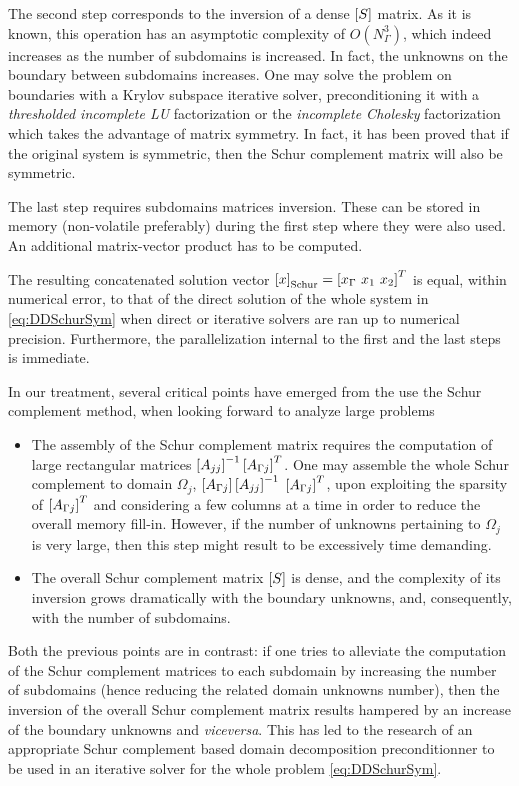 The second step corresponds to the inversion of a dense $\left[S\right]$ matrix. As it is known, this operation has an asymptotic complexity of $O(N_\Gamma^3)$, which indeed increases as the number of subdomains is increased. In fact, the unknowns on the boundary between subdomains increases. One may solve the problem on boundaries with a Krylov subspace iterative solver, preconditioning it with a \textit{thresholded incomplete LU} factorization  \cite{saad1994ilut} or the \textit{incomplete Cholesky} factorization which takes the advantage of matrix symmetry. In fact, it has been proved \cite{mathew2008domain} that if the original system is symmetric, then the Schur complement matrix will also be symmetric.

The last step requires subdomains matrices inversion. These can be stored in memory (non-volatile preferably) during the first step where they were also used. An additional matrix-vector product has to be computed.

The resulting concatenated solution vector $\vect{x}_\mathrm{Schur} = \vect{x_\Gamma \ x_1 \ x_2}^T$ is equal, within numerical error, to that of the direct solution of the whole system in \eqref{eq:DDSchurSym} when direct or iterative solvers are ran up to numerical precision. Furthermore, the parallelization internal to the first and the last steps is immediate.

In our treatment, several critical points have emerged from the use the Schur complement method, when looking forward to analyze large problems

\begin{itemize}
\item The assembly of the Schur complement matrix requires the computation of large rectangular matrices $\left[A_{jj}\right]^{-1} \left[A_{\Gamma j}\right]^T$. One may assemble the whole Schur complement to domain $\Omega_j$, $\left[A_{\Gamma j}\right] \left[A_{jj}\right]^{-1}$ $\left[A_{\Gamma j}\right]^T$, upon exploiting the sparsity of $\left[A_{\Gamma j}\right]^T$ and considering a few columns at a time in order to reduce the overall memory fill-in. However, if the number of unknowns pertaining to $\Omega_j$ is very large, then this step might result to be excessively time demanding.
\item The overall Schur complement matrix $\left[S\right]$ is dense, and the complexity of its inversion grows dramatically with the boundary unknowns, and, consequently, with the number of subdomains.
\end{itemize}

\noindent Both the previous points are in contrast: if one tries to alleviate the computation of the Schur complement matrices to each subdomain by increasing the number of subdomains (hence reducing the related domain unknowns number), then the inversion of the overall Schur complement matrix results hampered by an increase of the boundary unknowns and \textit{viceversa}. This has led to the research of an appropriate Schur complement based domain decomposition preconditionner to be used in an iterative solver for the whole problem \eqref{eq:DDSchurSym}.

